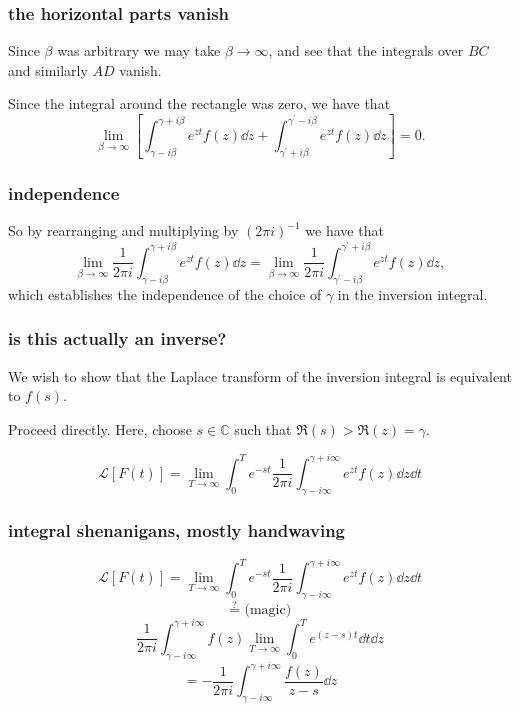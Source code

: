 \documentclass[mathserif]{beamer}
\newcommand{\sbr}[1]{\left[#1\right]}
\begin{document}
\begin{frame}
  \frametitle{the horizontal parts vanish}

  Since $\beta$ was arbitrary we may take $\beta\to \infty$, and see that the integrals over $BC$ and similarly $AD$ vanish.

  Since the integral around the rectangle was zero, we have that \[\lim_{\beta\to\infty}\sbr{\int_{\gamma-i\beta}^{\gamma+i\beta}e^{zt}f(z)\dd{z} + \int_{\gamma^{\prime}+i\beta}^{\gamma^{\prime}-i\beta}e^{zt}f(z)\dd{z}} = 0.\]

\end{frame}

\begin{frame}
  \frametitle{independence}

  So by rearranging and multiplying by $(2\pi i)^{-1}$ we have that \[\lim_{\beta\to\infty}\frac{1}{2\pi i}\int_{\gamma-i\beta}^{\gamma+i\beta}e^{zt}f(z)\dd{z} = \lim_{\beta\to\infty}\frac{1}{2\pi i}\int_{\gamma^{\prime}-i\beta}^{\gamma^{\prime}+i\beta}e^{zt}f(z)\dd{z},\] which establishes the independence of the choice of $\gamma$ in the inversion integral.

\end{frame}

\begin{frame}
  \frametitle{is this actually an inverse?}

  We wish to show that the Laplace transform of the inversion integral is equivalent to $f(s)$.

  Proceed directly. Here, choose $s\in\mathbb{C}$ such that $\Re(s)>\Re(z) = \gamma$.

  \[\mathcal{L}[F(t)] = \lim_{T\to \infty}\int_0^Te^{-st}\frac{1}{2\pi i}\int_{\gamma-i\infty}^{\gamma+i\infty}e^{zt}f(z)\dd{z}\dd{t}\]

\end{frame}

\begin{frame}
  \frametitle{integral shenanigans, mostly handwaving}

  \[\mathcal{L}[F(t)] = \lim_{T\to \infty}\int_0^Te^{-st}\frac{1}{2\pi i}\int_{\gamma-i\infty}^{\gamma+i\infty}e^{zt}f(z)\dd{z}\dd{t}\]
  \[\stackrel{?}{=}\text{ (magic)}\]
  \[\frac{1}{2\pi i}\int_{\gamma-i\infty}^{\gamma+i\infty}f(z)\lim_{T\to \infty}\int_0^T e^{(z-s)t}\dd{t}\dd{z}\]
  \[ = -\frac{1}{2\pi i}\int_{\gamma-i\infty}^{\gamma+i\infty} \frac{f(z)}{z-s}\dd{z}\]

\end{frame}
\end{document}
